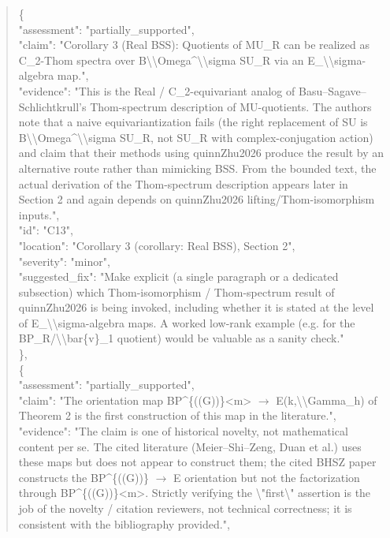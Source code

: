 \documentclass[11pt]{article}
\begin{document}
\begin{quote}
    \{\\
      "assessment": "partially\_supported",\\
      "claim": "Corollary 3 (Real BSS): Quotients of MU\_R can be realized as C\_2-Thom spectra over B\textbackslash{}\textbackslash{}Omega\^{}\textbackslash{}\textbackslash{}sigma SU\_R via an E\_\textbackslash{}\textbackslash{}sigma-algebra map.",\\
      "evidence": "This is the Real / C\_2-equivariant analog of Basu--Sagave--Schlichtkrull's Thom-spectrum description of MU-quotients. The authors note that a naive equivariantization fails (the right replacement of SU is B\textbackslash{}\textbackslash{}Omega\^{}\textbackslash{}\textbackslash{}sigma SU\_R, not SU\_R with complex-conjugation action) and claim that their methods using quinnZhu2026 produce the result by an alternative route rather than mimicking BSS. From the bounded text, the actual derivation of the Thom-spectrum description appears later in Section 2 and again depends on quinnZhu2026 lifting/Thom-isomorphism inputs.",\\
      "id": "C13",\\
      "location": "Corollary 3 (corollary: Real BSS), Section 2",\\
      "severity": "minor",\\
      "suggested\_fix": "Make explicit (a single paragraph or a dedicated subsection) which Thom-isomorphism / Thom-spectrum result of quinnZhu2026 is being invoked, including whether it is stated at the level of E\_\textbackslash{}\textbackslash{}sigma-algebra maps. A worked low-rank example (e.g. for the BP\_R/\textbackslash{}\textbackslash{}bar\{v\}\_1 quotient) would be valuable as a sanity check."\\
    \},\\
    \{\\
      "assessment": "partially\_supported",\\
      "claim": "The orientation map BP\^{}\{((G))\}<m> \ensuremath{\to} E(k,\textbackslash{}\textbackslash{}Gamma\_h) of Theorem 2 is the first construction of this map in the literature.",\\
      "evidence": "The claim is one of historical novelty, not mathematical content per se. The cited literature (Meier--Shi--Zeng, Duan et al.) uses these maps but does not appear to construct them; the cited BHSZ paper constructs the BP\^{}\{((G))\} \ensuremath{\to} E orientation but not the factorization through BP\^{}\{((G))\}<m>. Strictly verifying the \textbackslash{}"first\textbackslash{}" assertion is the job of the novelty / citation reviewers, not technical correctness; it is consistent with the bibliography provided.",\\

\end{quote}
\end{document}
